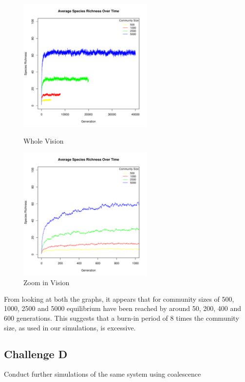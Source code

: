 \documentclass[12pt]{article}
\begin{document}
\begin{figure}[htbp]
\centering
\begin{minipage}[t]{0.48\textwidth}
\centering
\includegraphics[width=6.7cm]{../../results/ChallengeC.pdf}
\caption{Whole Vision}
\end{minipage}
\begin{minipage}[t]{0.48\textwidth}
\centering
\includegraphics[width=6.7cm]{../../results/ChallengeC-2.pdf}
\caption{Zoom in Vision}
\end{minipage}
\end{figure}

From looking at both the graphs, it appears that for community sizes of 500, 1000, 2500 and 5000 equilibrium have been reached by around 50, 200, 400 and 600 generations. This suggests that a burn-in period of 8 times the community size, as used in our simulations, is excessive.

\newpage
\subsection{Challenge D}
Conduct further simulations of the same system using coalescence 
\end{document}
